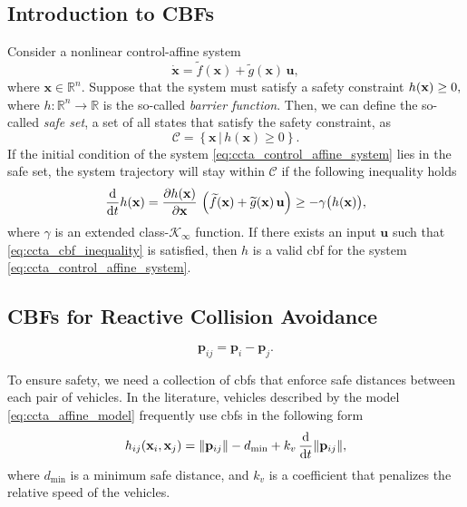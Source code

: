 \subsection{Introduction to CBFs}
Consider a nonlinear control-affine system
\begin{equation}
    \dot{\mathbf{x}} = \widetilde{f}(\mathbf{x}) + \widetilde{g}(\mathbf{x})\,\mathbf{u},
    \label{eq:ccta_control_affine_system}
\end{equation}
\noindent where $\mathbf{x} \in \mathbb{R}^n$.
Suppose that the system must satisfy a safety constraint
$
    h(\mathbf{x}) \geq 0,
$
where $h : \mathbb{R}^{n} \rightarrow \mathbb{R}$ is the so-called \emph{barrier function}.
Then, we can define the so-called \emph{safe set}, a set of all states that satisfy the safety constraint, as
\begin{equation}
    \mathcal{C} = \left\{ \mathbf{x} \,|\, h(\mathbf{x}) \geq 0 \right\}.
\end{equation}
If the initial condition of the system \eqref{eq:ccta_control_affine_system} lies in the safe set, the system trajectory will stay within $\mathcal{C}$ if the following inequality holds \cite{ames_control_2019}
\begin{equation}
    \frac{{\rm d}}{{\rm d}t}h(\mathbf{x}) = \frac{\partial h(\mathbf{x})}{\partial \mathbf{x}}\,\left(\widetilde{f}(\mathbf{x}) + \widetilde{g}(\mathbf{x})\,\mathbf{u}\right) \geq - \gamma\bigl(h(\mathbf{x})\bigr),
    \label{eq:ccta_cbf_inequality}
\end{equation}
where $\gamma$ is an extended class-$\mathcal{K}_{\infty}$ function. 
If there exists an input $\mathbf{u}$ such that \eqref{eq:ccta_cbf_inequality} is satisfied, then $h$ is a valid \gls{cbf} for the system \eqref{eq:ccta_control_affine_system}.

\subsection{CBFs for Reactive Collision Avoidance}
\begin{equation}
    \mathbf{p}_{ij} = \mathbf{p}_{i} - \mathbf{p}_{j}.
    \label{eq:ccta_p_ij}
\end{equation}

To ensure safety, we need a collection of \glspl{cbf} that enforce safe distances between each pair of vehicles.
In the literature, vehicles described by the model \eqref{eq:ccta_affine_model} frequently use \glspl{cbf} in the following form \cite{basso_safety-critical_2020,thyri_reactive_2020}
\begin{equation}
    h_{ij}(\mathbf{x}_{i}, \mathbf{x}_{j}) = \|\mathbf{p}_{ij}\| - d_{\min} + k_v\,\frac{\rm d}{{\rm d}t}\|\mathbf{p}_{ij}\|,
    \label{eq:ccta_CBF}
\end{equation}
where $d_{\min}$ is a minimum safe distance, and $k_v$ is a coefficient that penalizes the relative speed of the vehicles.

